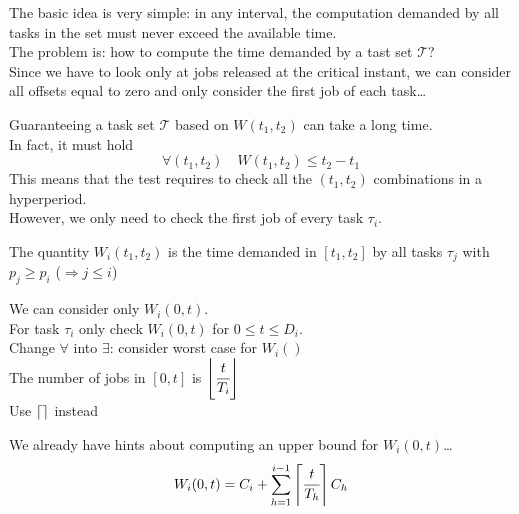 The basic idea is very simple: in any interval, the computation demanded by all tasks in the set must never exceed the available time.\\
The problem is: how to compute the time demanded by a tast set $\mathcal{T}$?\\
Since we have to look only at jobs released at the critical instant, we can consider all offsets equal to zero and only consider the first job of each task\dots
{}

    Guaranteeing a task set $\mathcal{T}$ based on $W(t_1, t_2)$ can take a long time.\\
    In fact, it must hold
    \[\forall(t_1, t_2) \quad W(t_1, t_2) \le t_2 - t_1\]
    This means that the test requires to check all the $(t_1, t_2)$ combinations in a hyperperiod.\\
    However, we only need to check the first job of every task $\tau_i$.

    The quantity $W_i(t_1, t_2)$ is the time demanded in $[t_1, t_2]$ by all tasks $\tau_j$ with $p_j \ge p_i$ ($\Rightarrow j \le i$)

    We can consider only $W_i(0,t)$.\\
    For task $\tau_i$ only check $W_i(0,t)$ for $0\le t\le D_i$.\\
    Change $\forall$ into $\exists$: consider worst case for $W_i()$\\
    The number of jobs in $[0,t]$ is $\left\lfloor \cfrac{t}{T_i} \right\rfloor$\\
    Use $\left\lceil  \right\rceil$ instead

    We already have hints about computing an upper bound for $W_i(0,t)$\dots
    \[W_i(0,t) = C_i + \sum_{h=1}^{i-1} \left\lceil \cfrac{t}{T_h} \right\rceil C_h\]

